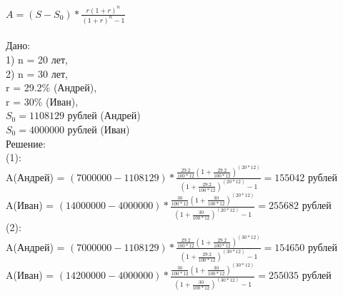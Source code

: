 \documentclass[12pt, a4paper]{report}
\begin{document}
	\( A = (S - S_{0}) * \frac{r (1 + r)^n}{(1 + r)^n - 1} \) \\
	\\
	Дано: \\
	1) n = 20 лет, \\
	2) n = 30 лет, \\
	r = 29.2\% (Андрей), \\
	r = 30\% (Иван), \\
	\( S_{0} = 1108129 \) рублей (Андрей) \\
	\( S_{0} = 4000000 \) рублей (Иван) \\
	Решение: \\
	(1): \\
	A(Андрей) = \( (7000000 - 1108129) * \frac{\frac{29.2}{100*12} (1 + \frac{29.2}{100*12})^{(20 * 12)}}{(1 + \frac{29.2}{100*12})^{(20 * 12)} - 1} = 155042 \) рублей \\
	A(Иван) = \( (14000000 - 4000000) * \frac{\frac{30}{100*12} (1 + \frac{30}{100*12})^{(20 * 12)}}{(1 + \frac{30}{100*12})^{(20 * 12)} - 1} = 255682\) рублей \\
	(2): \\
	A(Андрей) = \( (7000000 - 1108129) * \frac{\frac{29.2}{100*12} (1 + \frac{29.2}{100*12})^{(30 * 12)}}{(1 + \frac{29.2}{100*12})^{(30 * 12)} - 1} = 154650 \) рублей \\
	A(Иван) = \( (14200000 - 4000000) * \frac{\frac{30}{100*12} (1 + \frac{30}{100*12})^{(30 * 12)}}{(1 + \frac{30}{100*12})^{(30 * 12)} - 1} = 255035\) рублей \\
\end{document}
